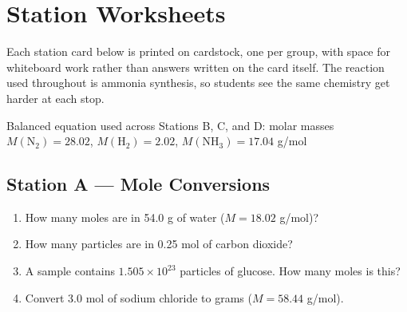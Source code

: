 \section{Station Worksheets}
\label{sec:worksheet}

Each station card below is printed on cardstock, one per group, with
space for whiteboard work rather than answers written on the card
itself. The reaction used throughout is ammonia synthesis, so students
see the same chemistry get harder at each stop.

\begin{center}
\end{center}
\vspace{2pt}
\begin{center}
\footnotesize\textcolor{inktext!70}{Balanced equation used across Stations B, C, and D: molar masses $M(\mathrm{N_2})=28.02$, $M(\mathrm{H_2})=2.02$, $M(\mathrm{NH_3})=17.04$ g/mol}
\end{center}

\subsection*{Station A --- Mole Conversions}
\begin{enumerate}[label=A\arabic*.]
  \item How many moles are in 54.0 g of water ($M = 18.02$ g/mol)?
  \item How many particles are in 0.25 mol of carbon dioxide?
  \item A sample contains $1.505 \times 10^{23}$ particles of glucose. How many moles is this?
  \item Convert 3.0 mol of sodium chloride to grams ($M = 58.44$ g/mol).
\end{enumerate}

